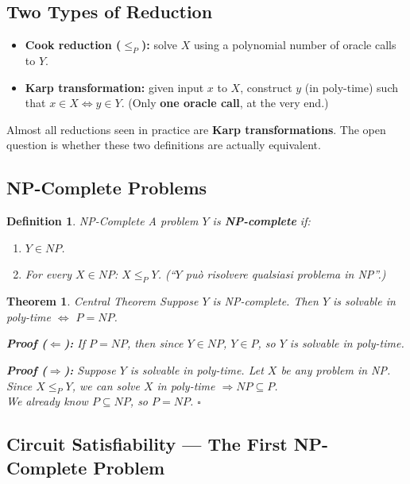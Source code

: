 \documentclass[12pt,a4paper]{report}
\newtheorem{definition}{Definition}
\newtheorem{theorem}{Theorem}
\begin{document}
\subsection{Two Types of Reduction}

\begin{itemize}
    \item \textbf{Cook reduction ($\leq_P$):} solve $X$ using a polynomial number of oracle calls to $Y$.
    \item \textbf{Karp transformation:} given input $x$ to $X$, construct $y$ (in poly-time) such that $x \in X \iff y \in Y$. (Only \textbf{one oracle call}, at the very end.)
\end{itemize}

Almost all reductions seen in practice are \textbf{Karp transformations}. The open question is whether these two definitions are actually equivalent.

\subsection{NP-Complete Problems}

\begin{definition}{NP-Complete}{}
A problem $Y$ is \textbf{NP-complete} if:
\begin{enumerate}
    \item $Y \in NP$.
    \item For every $X \in NP$: $X \leq_P Y$.
    \quad (``$Y$ può risolvere qualsiasi problema in NP''.)
\end{enumerate}
\end{definition}

\begin{theorem}{Central Theorem}{}
Suppose $Y$ is NP-complete. Then $Y$ is solvable in poly-time $\iff$ $P = NP$.

\textbf{Proof ($\Leftarrow$):} If $P = NP$, then since $Y \in NP$, $Y \in P$, so $Y$ is solvable in poly-time.

\textbf{Proof ($\Rightarrow$):} Suppose $Y$ is solvable in poly-time. Let $X$ be any problem in NP.\\
Since $X \leq_P Y$, we can solve $X$ in poly-time $\Rightarrow NP \subseteq P$.\\
We already know $P \subseteq NP$, so $P = NP$. $\square$
\end{theorem}

\subsection{Circuit Satisfiability --- The First NP-Complete Problem}
\end{document}
